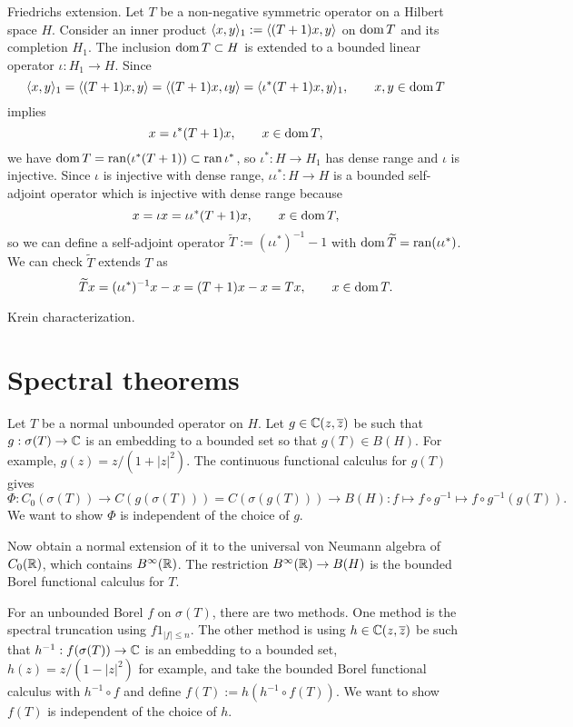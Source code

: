 \documentclass{../../large}
\begin{document}
\begin{prb}
Friedrichs extension.
Let $T$ be a non-negative symmetric operator on a Hilbert space $H$.
Consider an inner product $\langle x,y\rangle_1:=\langle(T+1)x,y\rangle$ on $\operatorname{dom} T$ and its completion $H_1$.
The inclusion $\operatorname{dom} T\subset H$ is extended to a bounded linear operator $\iota:H_1\to H$.
Since
\[\langle x,y\rangle_1=\langle(T+1)x,y\rangle=\langle(T+1)x,\iota y\rangle=\langle\iota^*(T+1)x,y\rangle_1,\qquad x,y\in\operatorname{dom} T\]
implies
\[x=\iota^*(T+1)x,\qquad x\in\operatorname{dom} T,\]
we have $\operatorname{dom} T=\operatorname{ran}(\iota^*(T+1))\subset\operatorname{ran}\iota^*$, so $\iota^*:H\to H_1$ has dense range and $\iota$ is injective.
Since $\iota$ is injective with dense range, $\iota\iota^*:H\to H$ is a bounded self-adjoint operator which is injective with dense range because
\[x=\iota x=\iota\iota^*(T+1)x,\qquad x\in\operatorname{dom} T,\] so we can define a self-adjoint operator $\tilde T:=(\iota\iota^*)^{-1}-1$ with $\operatorname{dom}\widetilde T=\operatorname{ran}(\iota\iota^*)$.
We can check $\tilde T$ extends $T$ as
\[\widetilde Tx=(\iota\iota^*)^{-1}x-x=(T+1)x-x=Tx,\qquad x\in\operatorname{dom} T.\]


Krein characterization.
\end{prb}



\section{Spectral theorems}

\begin{prb}
\end{prb}



\begin{prb}
Let $T$ be a normal unbounded operator on $H$.
Let $g\in\mathbb{C}(z,\overline z)$ be such that $g:\sigma(T)\to\mathbb{C}$ is an embedding to a bounded set so that $g(T)\in B(H)$.
For example, $g(z)=z/(1+|z|^2)$.
The continuous functional calculus for $g(T)$ gives
\[\Phi:C_0(\sigma(T))\to C(g(\sigma(T)))=C(\sigma(g(T)))\to B(H):f\mapsto f\circ g^{-1}\mapsto f\circ g^{-1}(g(T)).\]
We want to show $\Phi$ is independent of the choice of $g$.

Now obtain a normal extension of it to the universal von Neumann algebra of $C_0(\mathbb{R})$, which contains $B^\infty(\mathbb{R})$.
The restriction $B^\infty(\mathbb{R})\to B(H)$ is the bounded Borel functional calculus for $T$.

For an unbounded Borel $f$ on $\sigma(T)$, there are two methods.
One method is the spectral truncation using $f1_{|f|\le n}$.
The other method is using $h\in\mathbb{C}(z,\overline z)$ be such that $h^{-1}:f(\sigma(T))\to\mathbb{C}$ is an embedding to a bounded set, $h(z)=z/(1-|z|^2)$ for example, and take the bounded Borel functional calculus with $h^{-1}\circ f$ and define $f(T):=h(h^{-1}\circ f(T))$.
We want to show $f(T)$ is independent of the choice of $h$.
\begin{parts}
\item 
\end{parts}
\end{prb}
\end{document}
